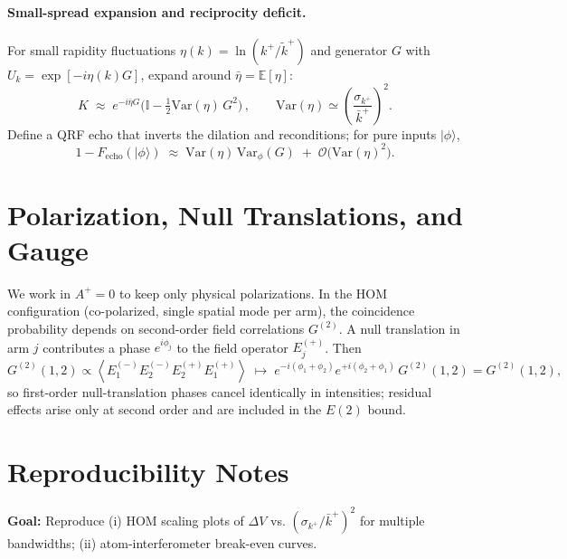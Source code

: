 \documentclass[aps,11pt]{article}
\providecommand{\ket}[1]{|#1\rangle}
\newcommand{\Var}{\mathrm{Var}}
\newcommand{\E}{\mathbb{E}}
\newcommand{\kplus}{k^{+}}
\newcommand{\kbar}{\bar{k}^{+}}
\newcommand{\ktil}{\tilde{k}^{+}}
\begin{document}
\paragraph{Small-spread expansion and reciprocity deficit.}
For small rapidity fluctuations \(\eta(k)=\ln(\kplus/\ktil)\) and generator \(G\) with \(U_k=\exp[-i\eta(k)G]\), expand around \(\bar\eta=\E[\eta]\):
\begin{equation}\label{eq:echo}
K \;\approx\; e^{-i\bar\eta G}\Big(\mathbb I - \tfrac{1}{2}\Var(\eta)\,G^2\Big)\,,
\qquad \Var(\eta)\simeq \left(\frac{\sigma_{\kplus}}{\kbar}\right)^{2}.
\end{equation}
Define a QRF echo that inverts the dilation and reconditions; for pure inputs \(\ket{\phi}\),
\begin{equation}
1-F_{\mathrm{echo}}(\ket{\phi}) \;\approx\; \Var(\eta)\,\Var_{\phi}(G) \;+\; \mathcal O\!\big(\Var(\eta)^{2}\big).
\end{equation}

\section{Polarization, Null Translations, and Gauge}\label{app:pol}
We work in \(A^+=0\) to keep only physical polarizations. In the HOM configuration (co-polarized, single spatial mode per arm), the coincidence probability depends on second-order field correlations \(G^{(2)}\). A null translation in arm \(j\) contributes a phase \(e^{i\phi_j}\) to the field operator \(E^{(+)}_j\). Then
\begin{equation}
G^{(2)}(1,2)\propto \left\langle E^{(-)}_1 E^{(-)}_2 E^{(+)}_2 E^{(+)}_1 \right\rangle
\;\mapsto\; e^{-i(\phi_1+\phi_2)}e^{+i(\phi_2+\phi_1)}\,G^{(2)}(1,2)=G^{(2)}(1,2),
\end{equation}
so first-order null-translation phases cancel identically in intensities; residual effects arise only at second order and are included in the \(E(2)\) bound.

\section{Reproducibility Notes}\label{app:repro}
\textbf{Goal:} Reproduce (i) HOM scaling plots of \(\Delta V\) vs. \((\sigma_{\kplus}/\kbar)^{2}\) for multiple bandwidths; (ii) atom-interferometer break-even curves.
\end{document}
